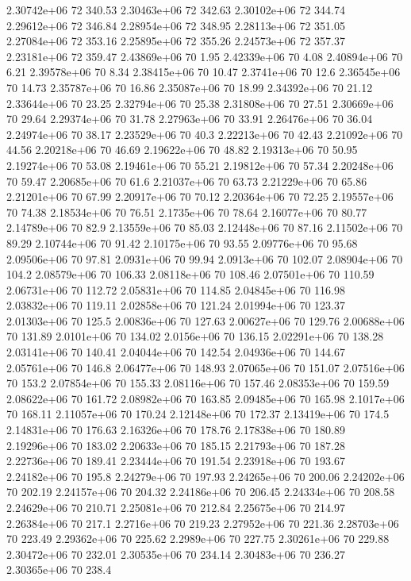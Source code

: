2.30742e+06 72 340.53
2.30463e+06 72 342.63
2.30102e+06 72 344.74
2.29612e+06 72 346.84
2.28954e+06 72 348.95
2.28113e+06 72 351.05
2.27084e+06 72 353.16
2.25895e+06 72 355.26
2.24573e+06 72 357.37
2.23181e+06 72 359.47
2.43869e+06 70 1.95
2.42339e+06 70 4.08
2.40894e+06 70 6.21
2.39578e+06 70 8.34
2.38415e+06 70 10.47
2.3741e+06 70 12.6
2.36545e+06 70 14.73
2.35787e+06 70 16.86
2.35087e+06 70 18.99
2.34392e+06 70 21.12
2.33644e+06 70 23.25
2.32794e+06 70 25.38
2.31808e+06 70 27.51
2.30669e+06 70 29.64
2.29374e+06 70 31.78
2.27963e+06 70 33.91
2.26476e+06 70 36.04
2.24974e+06 70 38.17
2.23529e+06 70 40.3
2.22213e+06 70 42.43
2.21092e+06 70 44.56
2.20218e+06 70 46.69
2.19622e+06 70 48.82
2.19313e+06 70 50.95
2.19274e+06 70 53.08
2.19461e+06 70 55.21
2.19812e+06 70 57.34
2.20248e+06 70 59.47
2.20685e+06 70 61.6
2.21037e+06 70 63.73
2.21229e+06 70 65.86
2.21201e+06 70 67.99
2.20917e+06 70 70.12
2.20364e+06 70 72.25
2.19557e+06 70 74.38
2.18534e+06 70 76.51
2.1735e+06 70 78.64
2.16077e+06 70 80.77
2.14789e+06 70 82.9
2.13559e+06 70 85.03
2.12448e+06 70 87.16
2.11502e+06 70 89.29
2.10744e+06 70 91.42
2.10175e+06 70 93.55
2.09776e+06 70 95.68
2.09506e+06 70 97.81
2.0931e+06 70 99.94
2.0913e+06 70 102.07
2.08904e+06 70 104.2
2.08579e+06 70 106.33
2.08118e+06 70 108.46
2.07501e+06 70 110.59
2.06731e+06 70 112.72
2.05831e+06 70 114.85
2.04845e+06 70 116.98
2.03832e+06 70 119.11
2.02858e+06 70 121.24
2.01994e+06 70 123.37
2.01303e+06 70 125.5
2.00836e+06 70 127.63
2.00627e+06 70 129.76
2.00688e+06 70 131.89
2.0101e+06 70 134.02
2.0156e+06 70 136.15
2.02291e+06 70 138.28
2.03141e+06 70 140.41
2.04044e+06 70 142.54
2.04936e+06 70 144.67
2.05761e+06 70 146.8
2.06477e+06 70 148.93
2.07065e+06 70 151.07
2.07516e+06 70 153.2
2.07854e+06 70 155.33
2.08116e+06 70 157.46
2.08353e+06 70 159.59
2.08622e+06 70 161.72
2.08982e+06 70 163.85
2.09485e+06 70 165.98
2.1017e+06 70 168.11
2.11057e+06 70 170.24
2.12148e+06 70 172.37
2.13419e+06 70 174.5
2.14831e+06 70 176.63
2.16326e+06 70 178.76
2.17838e+06 70 180.89
2.19296e+06 70 183.02
2.20633e+06 70 185.15
2.21793e+06 70 187.28
2.22736e+06 70 189.41
2.23444e+06 70 191.54
2.23918e+06 70 193.67
2.24182e+06 70 195.8
2.24279e+06 70 197.93
2.24265e+06 70 200.06
2.24202e+06 70 202.19
2.24157e+06 70 204.32
2.24186e+06 70 206.45
2.24334e+06 70 208.58
2.24629e+06 70 210.71
2.25081e+06 70 212.84
2.25675e+06 70 214.97
2.26384e+06 70 217.1
2.2716e+06 70 219.23
2.27952e+06 70 221.36
2.28703e+06 70 223.49
2.29362e+06 70 225.62
2.2989e+06 70 227.75
2.30261e+06 70 229.88
2.30472e+06 70 232.01
2.30535e+06 70 234.14
2.30483e+06 70 236.27
2.30365e+06 70 238.4
